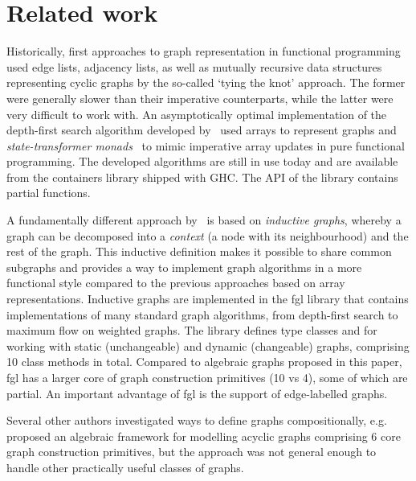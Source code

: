 \section{Related work}\label{sec-related}

Historically, first approaches to graph representation in functional programming
used edge lists, adjacency lists, as well as mutually recursive data structures
representing cyclic graphs by the so-called `tying the knot' approach. The former
were generally slower
than their imperative counterparts, while the latter were very difficult to
work with. An asymptotically optimal implementation of the depth-first search
algorithm developed by~\citet{1995_king_graphs} used arrays to represent graphs
and \emph{state-transformer monads}~\cite{1994_launchbury_st} to mimic imperative array
updates in pure functional programming. The developed algorithms are still in
use today and are available from the \textsf{containers} library shipped with GHC.
The API of the library contains partial functions.

A fundamentally different approach by~\citet{2001_erwig_inductive} is based
on \emph{inductive graphs}, whereby a graph can be decomposed into a \emph{context}
(a node with its neighbourhood) and the rest of the graph. This inductive
definition makes it possible to share common subgraphs and provides a way to
implement graph algorithms in a more functional style compared to the previous
approaches based on array representations. Inductive graphs are implemented in
the \textsf{fgl} library that contains implementations of many standard graph
algorithms, from depth-first search to maximum flow on weighted graphs. The library
defines type classes  and  for working with static
(unchangeable) and dynamic (changeable) graphs, comprising 10 class methods in total.
Compared to algebraic graphs proposed in this paper, \textsf{fgl} has a larger
core of graph construction primitives (10 vs 4), some of which are partial. An
important advantage of \textsf{fgl} is the support of edge-labelled graphs.

Several other authors investigated ways to define graphs compositionally,
e.g.~\citet{1995_gibbons_algebra} proposed an algebraic framework for modelling
acyclic graphs comprising 6 core graph construction primitives, but the approach
was not general enough to handle other practically useful classes of graphs.

